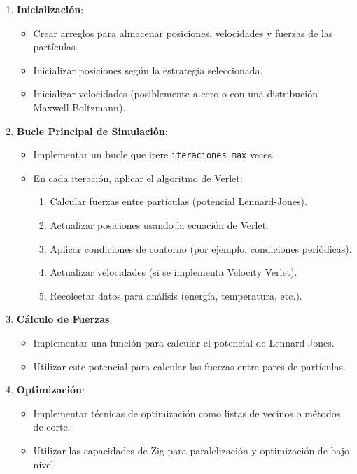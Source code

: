\documentclass[twocolumn]{article}
\begin{document}
\begin{enumerate}
    \item \textbf{Inicialización}:
    \begin{itemize}
        \item Crear arreglos para almacenar posiciones, velocidades y fuerzas de las partículas.
        \item Inicializar posiciones según la estrategia seleccionada.
        \item Inicializar velocidades (posiblemente a cero o con una distribución Maxwell-Boltzmann).
    \end{itemize}

    \item \textbf{Bucle Principal de Simulación}:
    \begin{itemize}
        \item Implementar un bucle que itere \texttt{iteraciones\_max} veces.
        \item En cada iteración, aplicar el algoritmo de Verlet:
        \begin{enumerate}
            \item Calcular fuerzas entre partículas (potencial Lennard-Jones).
            \item Actualizar posiciones usando la ecuación de Verlet.
            \item Aplicar condiciones de contorno (por ejemplo, condiciones periódicas).
            \item Actualizar velocidades (si se implementa Velocity Verlet).
            \item Recolectar datos para análisis (energía, temperatura, etc.).
        \end{enumerate}
    \end{itemize}

    \item \textbf{Cálculo de Fuerzas}:
    \begin{itemize}
        \item Implementar una función para calcular el potencial de Lennard-Jones.
        \item Utilizar este potencial para calcular las fuerzas entre pares de partículas.
    \end{itemize}

    \item \textbf{Optimización}:
    \begin{itemize}
        \item Implementar técnicas de optimización como listas de vecinos o métodos de corte.
        \item Utilizar las capacidades de Zig para paralelización y optimización de bajo nivel.
    \end{itemize}
\end{enumerate}
\end{document}

